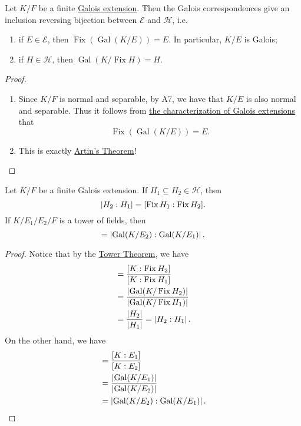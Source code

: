 \documentclass[notoc,notitlepage,nobib]{tufte-book}
\DeclareMathOperator{\Gal}{Gal}
\DeclareMathOperator{\Fix}{Fix}
\begin{document}
\begin{thm}\label{thm:fundamental_theorem_of_galois_theory}
  Let $K / F$ be a finite \hyperref[defn:galois_extension]{Galois extension}.
  Then the Galois correspondences give an inclusion reversing bijection between
  $\mathcal{E}$ and $\mathcal{H}$, i.e.
  \begin{enumerate}
    \item if $E \in \mathcal{E}$, then $\Fix (\Gal(K / E)) = E$. In particular,
      $K / E$ is Galois;
    \item if $H \in \mathcal{H}$, then $\Gal(K / \Fix H) = H$.
  \end{enumerate}
\end{thm}

\begin{proof}
  \begin{enumerate}
    \item Since $K / F$ is normal and separable, by A7, we have that $K / E$ is
      also normal and separable. Thus it follows from
      \hyperref[thm:characterization_of_galois_extensions]{the characterization
      of Galois extensions} that
      \begin{equation*}
        \Fix(\Gal(K / E)) = E.
      \end{equation*}
    \item This is exactly \hyperref[thm:artin_s_theorem]{Artin's Theorem}!
  \end{enumerate}
\end{proof}

\begin{crly}\label{crly:relation_between_index_and_degree}
  Let $K / F$ be a finite Galois extension. If $H_1 \subseteq H_2 \in
  \mathcal{H}$, then
  \begin{equation*}
    \abs{ H_2 : H_1 } = [ \Fix H_1 : \Fix H_2 ].
  \end{equation*}
  If $K / E_1 / E_2 / F$ is a tower of fields, then
  \begin{equation*}
    [ E_1 : E_2 ] = \abs{ \Gal(K / E_2) : \Gal(K / E_1) }.
  \end{equation*}
\end{crly}

\begin{proof}
  Notice that by the \hyperref[thm:tower_theorem]{Tower Theorem}, we have
  \begin{align*}
    [ \Fix H_1 : \Fix H_2 ]
    &= \frac{[ K : \Fix H_2 ]}{[ K : \Fix H_1 ]} \\
    &= \frac{\abs{\Gal(K / \Fix H_2)}}{\abs{\Gal(K / \Fix H_1)}} \\
    &= \frac{\abs{H_2}}{\abs{H_1}} = \abs{ H_2 : H_1 }.
  \end{align*}
  On the other hand, we have
  \begin{align*}
    [ E_1 : E_2 ]
    &= \frac{[ K : E_1 ]}{[ K : E_2 ]} \\
    &= \frac{\abs{\Gal(K / E_1)}}{\abs{\Gal(K / E_2)}} \\
    &= \abs{\Gal(K / E_2) : \Gal(K / E_1)}.
  \end{align*}
\end{proof}
\end{document}
